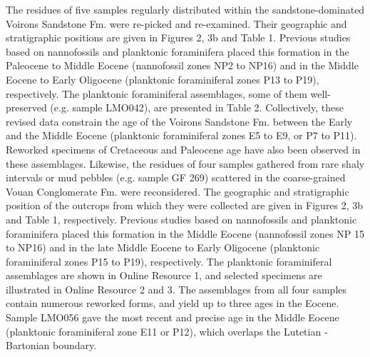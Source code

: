 \documentclass[twoside]{article}
\begin{document}
The residues of five samples regularly distributed within the sandstone-dominated Voirons Sandstone Fm. were re-picked and re-examined. Their geographic and stratigraphic positions are given in Figures 2, 3b and Table 1. Previous studies based on nannofossils \citep{JanduChene1975c,Stuijvenberg1980a} and planktonic foraminifera \citep{Ospina-Ostios2013,Ospina-Ostios2017} placed this formation in the Paleocene to Middle Eocene (nannofossil zones NP2 to NP16) and in the Middle Eocene to Early Oligocene (planktonic foraminiferal zones P13 to P19), respectively. The planktonic foraminiferal assemblages, some of them well-preserved (e.g. sample LMO042), are presented in Table 2. Collectively, these revised data constrain the age of the Voirons Sandstone Fm. between the Early and the Middle Eocene (planktonic foraminiferal zones E5 to E9, or P7 to P11). Reworked specimens of Cretaceous and Paleocene age have also been observed in these assemblages.
Likewise, the residues of four samples gathered from rare shaly intervals or mud pebbles (e.g. sample GF 269) scattered in the coarse-grained Vouan Conglomerate Fm. were reconsidered. The geographic and stratigraphic position of the outcrops from which they were collected are given in Figures 2, 3b and Table 1, respectively. Previous studies based on nannofossils \citep{JanduChene1975c,Stuijvenberg1980a} and planktonic foraminifera \citep{Frebourg2006,Ospina-Ostios2013,Ospina-Ostios2017} placed this formation in the Middle Eocene (nannofossil zones NP 15 to NP16) and in the late Middle Eocene to Early Oligocene (planktonic foraminiferal zones P15 to P19), respectively. The planktonic foraminiferal assemblages are shown in Online Resource 1, and selected specimens are illustrated in Online Resource 2 and 3. The assemblages from all four samples contain numerous reworked forms, and yield up to three ages in the Eocene. Sample LMO056 gave the most recent and precise age in the Middle Eocene (planktonic foraminiferal zone E11 or P12), which overlaps the Lutetian - Bartonian boundary.\par
\end{document}
